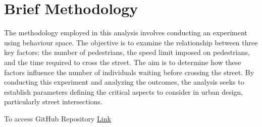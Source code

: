 \documentclass[10pt]{report}
\numberwithin{figure}{section}
\numberwithin{table}{section}
\begin{document}
\vspace{5mm} %

\section{Brief Methodology }

The methodology employed in this analysis involves conducting an experiment using behaviour space. The objective is to examine the relationship between three key factors: the number of pedestrians, the speed limit imposed on pedestrians, and the time required to cross the street. The aim is to determine how these factors influence the number of individuals waiting before crossing the street. By conducting this experiment and analyzing the outcomes, the analysis seeks to establish parameters defining the critical aspects to consider in urban design, particularly street intersections. 


\printbibliography[title = {References}]

\vspace{5mm} %

To access GitHub Repository \href{https://github.com/brfelipealmeida/ABM_coursework}{Link}
\end{document}
